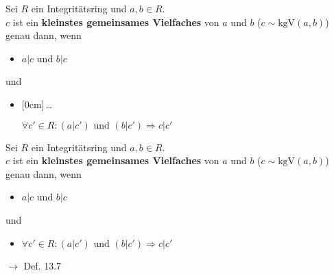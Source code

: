 \documentclass[11pt]{article}
\renewcommand{\cite}[1]{\par\bigskip\hfill{\color{gray}\tiny\(\to\) #1}}
\newcommand{\hide}[1]{\parbox{0cm}{\raisebox{-7pt}[0cm]{\dots}}\color{white}#1\color{black}}
\let\olddots\dots
\renewcommand{\dots}{\,\olddots\,}
\newenvironment{field}{}{\newpage}
\newif\ifnote
\newenvironment{note}{\notetrue}{\notefalse}
\begin{document}
\begin{note}
    \begin{field}
        Sei $R$ ein Integritätsring und $a,b\in R$.\\
        $c$ ist ein \textbf{kleinstes gemeinsames Vielfaches} von $a$ und $b$ ($c \sim \text{kgV}(a,b)$) genau dann, wenn
        \begin{itemize}
            \item $a\vert c$ und $b\vert c$
        \end{itemize}
        und
        \begin{itemize}
            \item \hide{$\forall c'\in R\colon (a\vert c') \text{ und } (b\vert c') \Rightarrow c\vert c'$}
        \end{itemize}
    \end{field}
    \begin{field}
        Sei $R$ ein Integritätsring und $a,b\in R$.\\
        $c$ ist ein \textbf{kleinstes gemeinsames Vielfaches} von $a$ und $b$ ($c \sim \text{kgV}(a,b)$) genau dann, wenn
        \begin{itemize}
            \item $a\vert c$ und $b\vert c$
        \end{itemize}
        und
        \begin{itemize}
            \item $\forall c'\in R\colon (a\vert c') \text{ und } (b\vert c') \Rightarrow c\vert c'$
        \end{itemize}
        \cite{Def. 13.7}
    \end{field}
\end{note}
\end{document}
